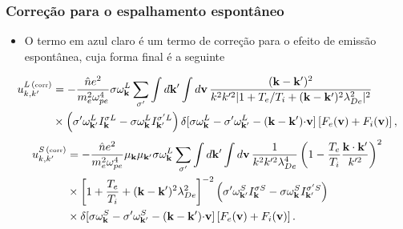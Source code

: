 \documentclass[10pt,aspectratio=1610,lualatex]{beamer}
\begin{document}
\begin{frame}
  \frametitle{Correção para o espalhamento espontâneo}
  \begin{itemize}
    \item O termo em azul claro é um termo de correção para o efeito
    de emissão espontânea, cuja forma final é a seguinte
  \end{itemize}
    \vspace{0.2cm}
    \begin{equation*}
      \begin{split}
	u_{k,k'}^{L\, (\mbox{\tiny corr})} &=
	-\frac{\hat n e^2}{m_e^2\omega_{pe}^4}\sigma \omega_{\bf k}^L
	\sum_{\sigma '} \int d{\bf k'}\int d{\bf v}\,
	\frac{({\bf k-k'})^2}{k^2 k'^2|1+T_e/T_i+({\bf k-k'})^2\lambda_{De}^2|^2}\\
	&\times \left( \sigma '\omega_{\bf k'}^L I_{\bf k}^{\sigma L}
	  -\sigma \omega_{\bf k}^L I_{\bf k'}^{\sigma 'L}\right)
	\delta[\sigma\omega_{\bf k}^L-\sigma '\omega_{\bf k'}^L
	-({\bf k-k'}){\bf \cdot v}]\left[ F_e({\bf v}) +F_i({\bf v})\right],
      \end{split}
    \end{equation*}
    \vspace{0.3cm}
    \begin{equation*}
      \begin{split}
	u_{k,k'}^{S\, (\mbox{\tiny corr})} &=
	-\frac{\hat n e^2}{m_e^2\omega_{pe}^4}\mu_{\bf k}\mu_{\bf k'}
	\sigma \omega_{\bf k}^L \sum_{\sigma '} \int d{\bf k'}
	\int d{\bf v}\, \frac{1}{k^2 k'^2\lambda_{De}^4}
	\left(1-\frac{T_e}{T_i} \frac{\bf k \cdot k'}{k'^2} \right)^2\\
	&\times	\left[1+\frac{T_e}{T_i}+({\bf k-k'})^2 \lambda_{De}^2
	\right]^{-2}\left( \sigma '\omega_{\bf k'}^S I_{\bf k}^{\sigma S}
	  -\sigma \omega_{\bf k}^S I_{\bf k'}^{\sigma 'S}\right)\\
	&\times \delta[\sigma\omega_{\bf k}^S-\sigma '\omega_{\bf k'}^S
	-({\bf k-k'}){\bf \cdot v}]\left[ F_e({\bf v}) +F_i({\bf v})\right].
      \end{split}
    \end{equation*}
\end{frame}
\end{document}
